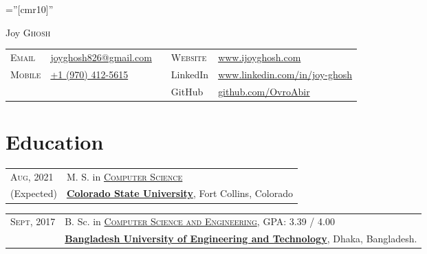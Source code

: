 \documentclass[a4paper,10pt]{article}
\begin{document}
\vspace{-\baselineskip}
\pagestyle{empty} %

\font\fb=''[cmr10]'' %

\par{\centering
    {\Huge Joy \textsc{Ghosh}
  }\bigskip\par}

\begin{tabular}{p{1.5cm}p{4cm}p{5cm}p{1.5cm}p{5cm}}
     \textsc{Email} & \href{mailto:joyghosh826@gmail.com}{joyghosh826@gmail.com}
     & & 
     \textsc{Website} & \href{www.ijoyghosh.com}{www.ijoyghosh.com} \\
     \textsc{Mobile} & \href{tel:+19704125615}{+1 (970) 412-5615} & & LinkedIn & \href{https://www.linkedin.com/in/joy-ghosh}{www.linkedin.com/in/joy-ghosh} \\
     & & & GitHub & \href{https://github.com/OvroAbir}{github.com/OvroAbir}
\end{tabular}


\section{Education}
\begin{tabular}{p{1.8cm}|l} 

  \textsc{Aug}, 2021 & M. S. in \href{https://compsci.colostate.edu}{\textsc{Computer Science}} \\
 (Expected) & \href{https://www.colostate.edu/}{\textbf{Colorado State University}}, Fort Collins, Colorado

\end{tabular}

\begin{tabular}{p{1.8cm}|l}
 \textsc{Sept}, 2017 & B. Sc. in \href{https://cse.buet.ac.bd/}{\textsc{Computer Science and Engineering}}, \normalsize \textsc{GPA}: 3.39 / 4.00 \\
 & \href{http://www.buet.ac.bd/}{\textbf{Bangladesh University of Engineering and Technology}}, Dhaka, Bangladesh.

\end{tabular}
\end{document}
